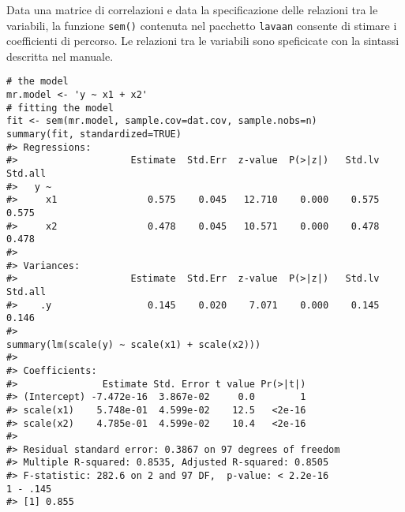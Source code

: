 Data una matrice di correlazioni e data la specificazione delle
  relazioni tra le variabili, la funzione {\tt sem()} contenuta nel
  pacchetto {\tt lavaan}  consente di stimare i coefficienti di
  percorso. 
Le  relazioni tra le variabili sono speficicate con la sintassi
  descritta nel manuale.

\begin{lstlisting}
# the model
mr.model <- 'y ~ x1 + x2'
# fitting the model
fit <- sem(mr.model, sample.cov=dat.cov, sample.nobs=n)
summary(fit, standardized=TRUE)
#> Regressions:
#>                    Estimate  Std.Err  z-value  P(>|z|)   Std.lv  Std.all
#>   y ~                                                                   
#>     x1                0.575    0.045   12.710    0.000    0.575    0.575
#>     x2                0.478    0.045   10.571    0.000    0.478    0.478
#> 
#> Variances:
#>                    Estimate  Std.Err  z-value  P(>|z|)   Std.lv  Std.all
#>    .y                 0.145    0.020    7.071    0.000    0.145    0.146                 
#>     
summary(lm(scale(y) ~ scale(x1) + scale(x2)))
#> 
#> Coefficients:
#>               Estimate Std. Error t value Pr(>|t|)    
#> (Intercept) -7.472e-16  3.867e-02     0.0        1    
#> scale(x1)    5.748e-01  4.599e-02    12.5   <2e-16 
#> scale(x2)    4.785e-01  4.599e-02    10.4   <2e-16 
#> 
#> Residual standard error: 0.3867 on 97 degrees of freedom
#> Multiple R-squared: 0.8535, Adjusted R-squared: 0.8505 
#> F-statistic: 282.6 on 2 and 97 DF,  p-value: < 2.2e-16 
1 - .145
#> [1] 0.855
\end{lstlisting}


